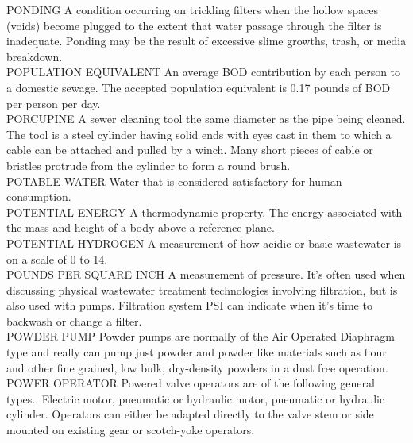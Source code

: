 PONDING
A condition occurring on trickling filters when the hollow spaces (voids) become plugged to the extent that water passage through the filter is inadequate. Ponding may be the result of excessive slime growths, trash, or media breakdown.
\vspace{0.3cm}\\
POPULATION EQUIVALENT
An average BOD contribution by each person to a domestic sewage. The accepted population equivalent is 0.17 pounds of BOD per person per day.
\vspace{0.3cm}\\
PORCUPINE
A sewer cleaning tool the same diameter as the pipe being cleaned. The tool is a steel cylinder having solid ends with eyes cast in them to which a cable can be attached and pulled by a winch. Many short pieces of cable or bristles protrude from the cylinder to form a round brush. 
\vspace{0.3cm}\\
POTABLE WATER
Water that is considered satisfactory for human consumption.
\vspace{0.3cm}\\
POTENTIAL ENERGY
A thermodynamic property. The energy associated with the mass and height of a body above a reference plane.
\vspace{0.3cm}\\
POTENTIAL HYDROGEN
A measurement of how acidic or basic wastewater is on a scale of 0 to 14.
\vspace{0.3cm}\\
POUNDS PER SQUARE INCH
A measurement of pressure. It’s often used when discussing physical wastewater treatment technologies involving filtration, but is also used with pumps. Filtration system PSI can indicate when it’s time to backwash or change a filter.
\vspace{0.3cm}\\
POWDER PUMP
Powder pumps are normally of the Air Operated Diaphragm type and really can pump just powder and powder like materials such as flour and other fine grained, low bulk, dry-density powders in a dust free operation.
\vspace{0.3cm}\\
POWER OPERATOR
Powered valve operators are of the following general types.. Electric motor, pneumatic or hydraulic motor, pneumatic or hydraulic cylinder. Operators can either be adapted directly to the valve stem or side mounted on existing gear or scotch-yoke operators.
\vspace{0.3cm}\\
